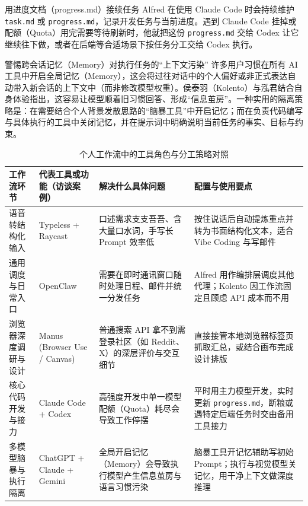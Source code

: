 \documentclass[UTF8,a4paper,11pt,fontset=fandol]{ctexart}
\begin{document}
\begin{knowledgebox}{用进度文档（progress.md）接续任务}
Alfred 在使用 Claude Code 时会持续维护 \texttt{task.md} 或 \texttt{progress.md}，记录开发任务与当前进度。遇到 Claude Code 挂掉或配额（Quota）用完需要等待刷新时，他就把这份 \texttt{progress.md} 交给 Codex 让它继续往下做，或者在后端等合适场景下按任务分工交给 Codex 执行。
\end{knowledgebox}
\begin{warningbox}{警惕跨会话记忆（Memory）对执行任务的“上下文污染”}
许多用户习惯在所有 AI 工具中开启全局记忆（Memory），这会将过往对话中的个人偏好或非正式表达自动带入新会话的上下文中（而非修改模型权重）。侯泰羽（Kolento）与泓君结合自身体验指出，这容易让模型顺着旧习惯回答、形成“信息茧房”。一种实用的隔离策略是：在需要结合个人背景发散思路的“脑暴工具”中开启记忆；而在负责代码编写与具体执行的工具中关闭记忆，并在提示词中明确说明当前任务的事实、目标与约束。
\end{warningbox}
\begin{table}[H]\centering\small
\caption{个人工作流中的工具角色与分工策略对照}
\begin{tabular}{>{\raggedright\arraybackslash}p{\dimexpr(\linewidth-8\tabcolsep)/4\relax}>{\raggedright\arraybackslash}p{\dimexpr(\linewidth-8\tabcolsep)/4\relax}>{\raggedright\arraybackslash}p{\dimexpr(\linewidth-8\tabcolsep)/4\relax}>{\raggedright\arraybackslash}p{\dimexpr(\linewidth-8\tabcolsep)/4\relax}}
\toprule
工作流环节 & 代表工具或功能（访谈案例） & 解决什么具体问题 & 配置与使用要点\\\midrule
语音转结构化输入 & Typeless + Raycast & 口述需求支支吾吾、含大量口水词，手写长 Prompt 效率低 & 按住说话后自动提炼重点并转为书面结构化文本，适合 Vibe Coding 与写邮件\\[4pt]
通用调度与日常入口 & OpenClaw & 需要在即时通讯窗口随时处理日程、邮件并统一分发任务 & Alfred 用作编排层调度其他代理；Kolento 因工作流固定且顾虑 API 成本而不用\\[4pt]
浏览器深度调研与设计 & Manus (Browser Use / Canvas) & 普通搜索 API 拿不到需登录社区（如 Reddit、X）的深层评价与交互细节 & 直接接管本地浏览器标签页抓取汇总，或结合画布完成设计排版\\[4pt]
核心代码开发与接力 & Claude Code + Codex & 高强度开发中单一模型配额（Quota）耗尽会导致工作停摆 & 平时用主力模型开发，实时更新 \texttt{progress.md}，断粮或遇特定后端任务时交由备用工具接力\\[4pt]
多模型脑暴与执行隔离 & ChatGPT + Claude + Gemini & 全局开启记忆（Memory）会导致执行模型产生信息茧房与语言习惯污染 & 脑暴工具开记忆辅助写初始 Prompt；执行与视觉模型关记忆，用干净上下文做深度推理\\[4pt]
\bottomrule\end{tabular}\end{table}
\end{document}
